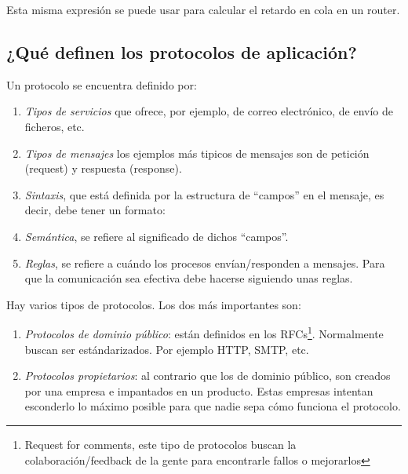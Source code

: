 \documentclass[10pt,a4paper,spanish]{report}
\begin{document}
Esta misma expresión se puede usar para calcular el retardo en cola en un router.

\subsection{\textcolor{tema2}{¿}Qué definen los protocolos de aplicación?}
Un protocolo se encuentra definido por:
\begin{enumerate}[\color{tema2}{$\triangle$}]
  \item \textit{\textcolor{tema2}{Tipos de servicios}} que ofrece, por ejemplo, de correo electrónico, de envío de ficheros, etc.
  \item \textit{\textcolor{tema2}{Tipos de mensajes}} los ejemplos más tipicos de mensajes son de petición (request) y respuesta (response).
  \item \textit{\textcolor{tema2}{Sintaxis}}, que está definida por la estructura de ``campos'' en el mensaje, es decir, debe tener un formato:

  

  \item \textit{\textcolor{tema2}{Semántica}}, se refiere al significado de dichos ``campos''.
  \item \textit{\textcolor{tema2}{Reglas}}, se refiere a cuándo los procesos envían/responden a mensajes. Para que la comunicación sea efectiva debe hacerse siguiendo unas reglas.
\end{enumerate}

Hay varios tipos de protocolos. Los dos más importantes son:
\begin{enumerate}[\color{tema2}{$\diamondsuit$}]
  \item \textit{\textcolor{tema2}{Protocolos de dominio público}}: están definidos en los RFCs\footnote{Request for comments, este tipo de protocolos buscan la colaboración/feedback de la gente para encontrarle fallos o mejorarlos}. Normalmente buscan ser estándarizados. Por ejemplo HTTP,  SMTP, etc.
  \item \textit{\textcolor{tema2}{Protocolos propietarios}}: al contrario que los de dominio público, son creados por una empresa e impantados en un producto. Estas empresas intentan esconderlo lo máximo posible para que nadie sepa cómo funciona el protocolo.
\end{enumerate}
\end{document}
